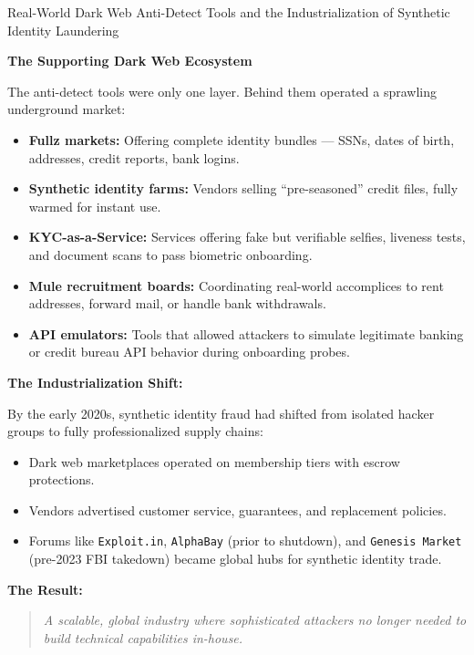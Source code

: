 \begin{HistoricalSidebar}{Real-World Dark Web Anti-Detect Tools and the Industrialization of Synthetic Identity Laundering}
    \medskip
    
    \textbf{The Supporting Dark Web Ecosystem}
    
    The anti-detect tools were only one layer. Behind them operated a sprawling underground market:
    
    \begin{itemize}
        \item \textbf{Fullz markets:} Offering complete identity bundles — SSNs, dates of birth, addresses, credit reports, bank logins.
        \item \textbf{Synthetic identity farms:} Vendors selling ``pre-seasoned'' credit files, fully warmed for instant use.
        \item \textbf{KYC-as-a-Service:} Services offering fake but verifiable selfies, liveness tests, and document scans to pass biometric onboarding.
        \item \textbf{Mule recruitment boards:} Coordinating real-world accomplices to rent addresses, forward mail, or handle bank withdrawals.
        \item \textbf{API emulators:} Tools that allowed attackers to simulate legitimate banking or credit bureau API behavior during onboarding probes.
    \end{itemize}
    
    \textbf{The Industrialization Shift:}
    
    By the early 2020s, synthetic identity fraud had shifted from isolated hacker groups to fully professionalized supply chains:
    
    \begin{itemize}
        \item Dark web marketplaces operated on membership tiers with escrow protections.
        \item Vendors advertised customer service, guarantees, and replacement policies.
        \item Forums like \texttt{Exploit.in}, \texttt{AlphaBay} (prior to shutdown), and \texttt{Genesis Market} (pre-2023 FBI takedown) became global hubs for synthetic identity trade.
    \end{itemize}
    
    \medskip
    
    \textbf{The Result:}
    
    \begin{quote}
    \emph{A scalable, global industry where sophisticated attackers no longer needed to build technical capabilities in-house.}
    

\end{quote}
\end{HistoricalSidebar}
